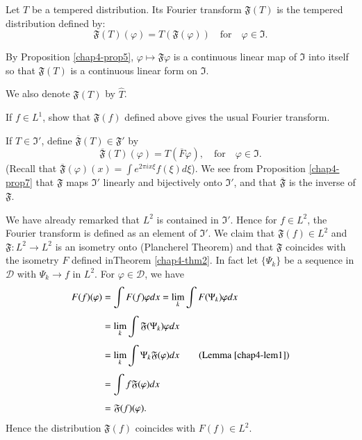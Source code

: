 \begin{defi*}
Let $T$ be a tempered distribution. Its Fourier transform
$\mathfrak{F}(T)$ is the tempered distribution defined by:
$$
\mathfrak{F}(T)(\varphi)=T(\mathfrak{F}(\varphi))\quad\text{for}\quad
\varphi \in \mathfrak{I}.
$$
\end{defi*}

\begin{remark*}
By Proposition \ref{chap4-prop5}, $\varphi\mapsto \mathfrak{F}\varphi$
is a continuous linear map of $\mathfrak{I}$ into itself so that
$\mathfrak{F}(T)$ is a continuous linear form on $\mathfrak{I}$.
\end{remark*}

We also denote $\mathfrak{F}(T)$ by $\widehat{T}$.

\begin{exer*}
If $f\in L^{1}$, show that $\mathfrak{F}(f)$ defined above gives the
usual Fourier transform.
\end{exer*}

If $T\in \mathfrak{I}'$, define $\overline{\mathfrak{F}}(T)\in
\mathfrak{F}'$ by
$$
\overline{\mathfrak{F}}(T)(\varphi)=T(\overline{F}\varphi),
\quad\text{for}\quad \varphi \in \mathfrak{I}.
$$
(Recall that $\overline{\mathfrak{F}}(\varphi)(x)=\int e^{2\pi
  ix\xi}f(\xi)d\xi$). We see from Proposition \ref{chap4-prop7} that
$\mathfrak{F}$ maps $\mathfrak{I}'$ linearly and bijectively onto
$\mathfrak{I}'$, and that $\overline{\mathfrak{F}}$ is the inverse of $\mathfrak{F}$.

\begin{remark*}
We have already remarked that $L^{2}$ is contained in
$\mathfrak{I}'$. Hence for $f\in L^{2}$, the Fourier transform is
defined as an element of $\mathfrak{I}'$. We claim that
$\mathfrak{F}(f)\in L^{2}$ and $\mathfrak{F}:L^{2}\to L^{2}$ is an
isometry onto (Plancherel Theorem) and that $\mathfrak{F}$ coincides
with the isometry $F$ defined in\pageoriginale Theorem
\ref{chap4-thm2}. In fact let $\{\Psi_{k}\}$ be a sequence in
$\mathcal{D}$ with $\Psi_{k}\to f$ in $L^{2}$. For $\varphi\in
\mathcal{D}$, we have
\begin{align*}
F(f)(\varphi) &= \int F(f)\varphi dx=\lim\limits_{k}\int
F(\Psi_{k})\varphi dx\\[4pt]
&= \lim\limits_{k}\int \mathfrak{F}(\Psi_{k})\varphi dx\\[4pt]
&= \lim\limits_{k}\int \Psi_{k}\mathfrak{F}(\varphi)dx\qquad
\text{(Lemma \ref{chap4-lem1})}\\[4pt]
&= \int f\mathfrak{F}(\varphi)dx\\[4pt]
&= \mathfrak{F}(f)(\varphi).
\end{align*}
Hence the distribution $\mathfrak{F}(f)$ coincides with $F(f)\in L^{2}$.
\end{remark*}


